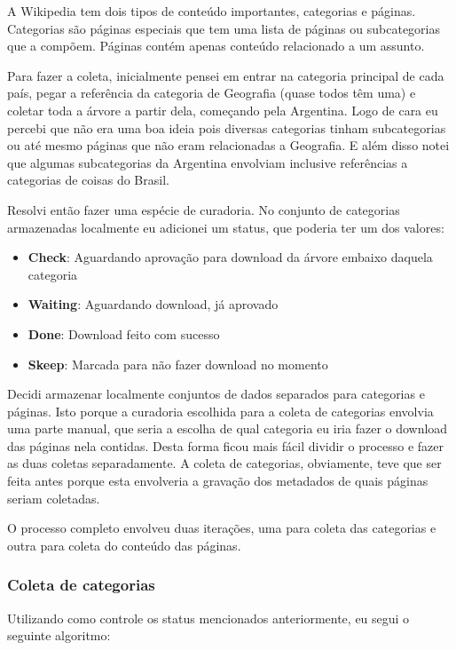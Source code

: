 A Wikipedia tem dois tipos de conteúdo importantes, categorias e páginas. Categorias são páginas especiais que tem uma lista de páginas ou 
subcategorias que a compõem. Páginas contém apenas conteúdo relacionado a um assunto.

Para fazer a coleta, inicialmente pensei em entrar na categoria principal de cada país, pegar a referência da categoria de Geografia 
(quase todos têm uma) e coletar toda a árvore a partir dela, começando pela Argentina. Logo de cara eu percebi que não era uma boa ideia 
pois diversas categorias tinham subcategorias ou até mesmo páginas que não eram relacionadas a Geografia. E além disso notei que algumas 
subcategorias da Argentina envolviam inclusive referências a categorias de coisas do Brasil. 

Resolvi então fazer uma espécie de curadoria. No conjunto de categorias armazenadas localmente eu adicionei um status, que poderia ter um dos valores:

\begin{itemize}
    \item \textbf{Check}: Aguardando aprovação para download da árvore embaixo daquela categoria
    \item \textbf{Waiting}: Aguardando download, já aprovado
    \item \textbf{Done}: Download feito com sucesso
    \item \textbf{Skeep}: Marcada para não fazer download no momento
\end{itemize}

Decidi armazenar localmente conjuntos de dados separados para categorias e páginas. Isto porque a curadoria escolhida para a coleta
de categorias envolvia uma parte manual, que seria a escolha de qual categoria eu iria fazer o download das páginas nela contidas. Desta 
forma ficou mais fácil dividir o processo e fazer as duas coletas separadamente. A coleta de categorias, obviamente, teve que ser feita antes 
porque esta envolveria a gravação dos metadados de quais páginas seriam coletadas.

O processo completo envolveu duas iterações, uma para coleta das categorias e outra para coleta do conteúdo das páginas.

\subsubsection{Coleta de categorias}

Utilizando como controle os status mencionados anteriormente, eu segui o seguinte algoritmo: 

